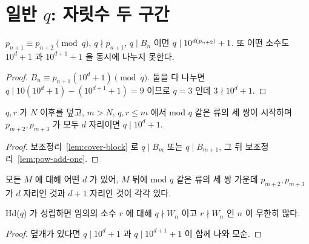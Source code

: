 \section{일반 \(q\): 자릿수 두 구간}

\begin{lemma}[같은 류 쌍의 블록, C8]
  \label{lem:pow-add-one}
  \leanok
  \(p_{n+1} \equiv p_{n+2} \pmod q\), \(q \nmid p_{n+1}\), \(q \mid B_n\) 이면 \(q \mid 10^{d(p_{n+2})} + 1\).
  또 어떤 소수도 \(10^d + 1\) 과 \(10^{d+1} + 1\) 을 동시에 나누지 못한다.
\end{lemma}
\begin{proof}
  \leanok
  \(B_n \equiv p_{n+1}(10^d + 1) \pmod q\). 둘을 다 나누면 \(q \mid 10(10^d+1) - (10^{d+1}+1) = 9\) 이므로
  \(q = 3\) 인데 \(3 \nmid 10^d + 1\).
\end{proof}

\begin{lemma}
  \label{lem:cover-pow}
  \leanok
  \(q, r\) 가 \(N\) 이후를 덮고, \(m > N\), \(q, r \le m\) 에서 mod \(q\) 같은 류의 세 쌍이 시작하며
  \(p_{m+2}, p_{m+3}\) 가 모두 \(d\) 자리이면 \(q \mid 10^d + 1\).
\end{lemma}
\begin{proof}
  \leanok
  보조정리~\ref{lem:cover-block} 로 \(q \mid B_m\) 또는 \(q \mid B_{m+1}\), 그 뒤 보조정리~\ref{lem:pow-add-one}.
\end{proof}

\begin{definition}[가정 Hd(\(q\))]
  \label{def:Hd}
  \leanok
  모든 \(M\) 에 대해 어떤 \(d\) 가 있어, \(M\) 뒤에 mod \(q\) 같은 류의 세 쌍 가운데
  \(p_{m+2}, p_{m+3}\) 가 \(d\) 자리인 것과 \(d+1\) 자리인 것이 각각 있다.
\end{definition}

\begin{theorem}[Hd(\(q\)) 에서 Q1, \(S = \{q, r\}\), C9]
  \label{thm:two-of-digit}
  \leanok
  Hd(\(q\)) 가 성립하면 임의의 소수 \(r\) 에 대해 \(q \nmid W_n\) 이고 \(r \nmid W_n\) 인 \(n\) 이 무한히 많다.
\end{theorem}
\begin{proof}
  \leanok
  덮개가 있다면 \(q \mid 10^d + 1\) 과 \(q \mid 10^{d+1} + 1\) 이 함께 나와 모순.
\end{proof}

